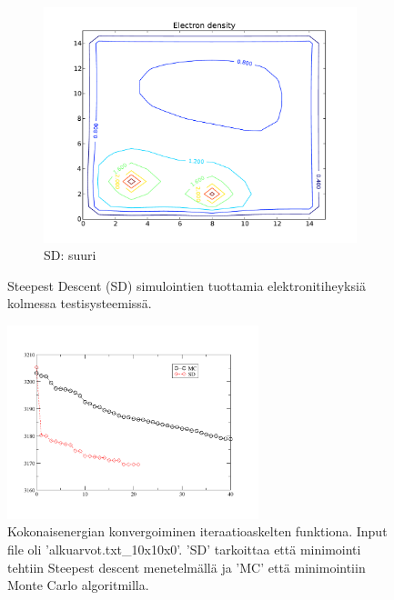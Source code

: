 \documentclass{article}
\begin{document}
\begin{figure}
        ~ %
        \begin{subfigure}[b]{0.3\textwidth}
                \includegraphics[width=\textwidth]{md_suuri.pdf}
                \caption{SD: suuri}
                \label{fig:mouse}
        \end{subfigure}
        \caption{Steepest Descent (SD) simulointien tuottamia elektronitiheyksiä kolmessa testisysteemissä.}\label{fig:animals}
        \label{fig:sd-simulaatiot}
\end{figure}

\begin{figure}[h]
\begin{center}
\includegraphics[width=0.65\textwidth]{keski_konvergenssi.pdf} %
\caption{Kokonaisenergian konvergoiminen iteraatioaskelten
  funktiona. Input file oli 'alkuarvot.txt\_10x10x0'. 'SD' tarkoittaa
  että minimointi tehtiin Steepest descent menetelmällä ja 'MC' että
  minimointiin Monte Carlo algoritmilla.}
\label{fig:konvergenssit}
\end{center}
\end{figure}
\end{document}
